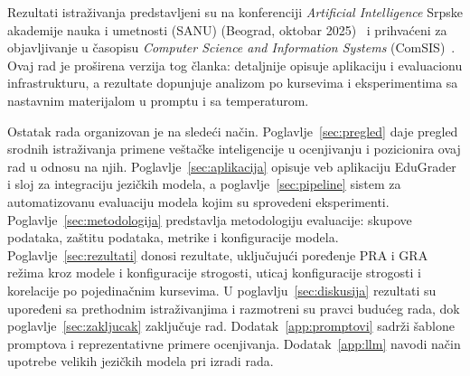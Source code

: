 Rezultati istraživanja predstavljeni su na konferenciji \emph{Artificial Intelligence} Srpske akademije nauka i umetnosti (SANU)
(Beograd, oktobar 2025)~\cite{ikovic2025edugraderconf}
i prihvaćeni za objavljivanje u časopisu \emph{Computer Science and Information Systems} (ComSIS)~\cite{ikovic2025edugrader}.
Ovaj rad je proširena verzija tog članka:
detaljnije opisuje aplikaciju i evaluacionu infrastrukturu, a rezultate dopunjuje analizom po kursevima i eksperimentima
sa nastavnim materijalom u promptu i sa temperaturom.

Ostatak rada organizovan je na sledeći način.
Poglavlje~\ref{sec:pregled} daje pregled srodnih istraživanja primene veštačke inteligencije u ocenjivanju
i pozicionira ovaj rad u odnosu na njih.
Poglavlje~\ref{sec:aplikacija} opisuje veb aplikaciju EduGrader i sloj za integraciju jezičkih modela,
a poglavlje~\ref{sec:pipeline} sistem za automatizovanu evaluaciju modela kojim su sprovedeni eksperimenti.
Poglavlje~\ref{sec:metodologija} predstavlja metodologiju evaluacije: skupove podataka, zaštitu podataka, metrike i konfiguracije modela.
Poglavlje~\ref{sec:rezultati} donosi rezultate, uključujući poređenje PRA i GRA režima kroz modele i konfiguracije strogosti,
uticaj konfiguracije strogosti i korelacije po pojedinačnim kursevima.
U poglavlju~\ref{sec:diskusija} rezultati su upoređeni sa prethodnim istraživanjima i razmotreni su pravci budućeg rada,
dok poglavlje~\ref{sec:zakljucak} zaključuje rad.
Dodatak~\ref{app:promptovi} sadrži šablone promptova i reprezentativne primere ocenjivanja.
Dodatak~\ref{app:llm} navodi način upotrebe velikih jezičkih modela pri izradi rada.
